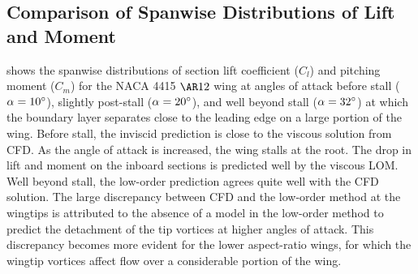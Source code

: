 \subsection{Comparison of Spanwise Distributions of Lift and Moment}
\label{sec:spanwise-loads}

 shows the spanwise distributions of section lift coefficient ($C_l$) and pitching moment  ($C_m$) for the NACA 4415 $\ar{12}$ wing at angles of attack before stall ($\alpha=10^\circ{}$), slightly post-stall ($\alpha=20^\circ{}$), and well beyond stall ($\alpha=32^\circ{}$) at which the boundary layer separates close to the leading edge on a large portion of the wing.
Before stall, the inviscid prediction is close to the viscous solution from CFD. As the angle of attack is increased, the wing stalls at the root. The drop in lift and moment on the inboard sections is predicted well by the viscous LOM. Well beyond stall, the low-order prediction agrees quite well with the CFD solution.
The large discrepancy between CFD and the low-order method at the wingtips is attributed to the absence of a model in the low-order method to predict the detachment of the tip vortices at higher angles of attack. This discrepancy becomes more evident for the lower aspect-ratio wings, for which the wingtip vortices affect flow over a considerable portion of the wing.

